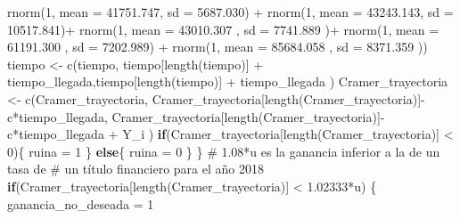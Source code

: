 \documentclass[
  us-letterpaper,
]{scrreprt}
\newenvironment{Shaded}{\begin{snugshade}}{\end{snugshade}}
\newcommand{\AttributeTok}[1]{\textcolor[rgb]{0.40,0.45,0.13}{#1}}
\newcommand{\CommentTok}[1]{\textcolor[rgb]{0.37,0.37,0.37}{#1}}
\newcommand{\ControlFlowTok}[1]{\textcolor[rgb]{0.00,0.23,0.31}{\textbf{#1}}}
\newcommand{\DecValTok}[1]{\textcolor[rgb]{0.68,0.00,0.00}{#1}}
\newcommand{\FloatTok}[1]{\textcolor[rgb]{0.68,0.00,0.00}{#1}}
\newcommand{\FunctionTok}[1]{\textcolor[rgb]{0.28,0.35,0.67}{#1}}
\newcommand{\NormalTok}[1]{\textcolor[rgb]{0.00,0.23,0.31}{#1}}
\newcommand{\OtherTok}[1]{\textcolor[rgb]{0.00,0.23,0.31}{#1}}
\newcommand{\SpecialCharTok}[1]{\textcolor[rgb]{0.37,0.37,0.37}{#1}}
\theoremstyle{definition}
\theoremstyle{plain}
\theoremstyle{plain}
\theoremstyle{remark}
\begin{document}
\begin{Shaded}
\begin{Highlighting}[]
               \FunctionTok{rnorm}\NormalTok{(}\DecValTok{1}\NormalTok{, }\AttributeTok{mean =}   \FloatTok{41751.747}\NormalTok{, }\AttributeTok{sd =} \FloatTok{5687.030}\NormalTok{) }\SpecialCharTok{+} 
               \FunctionTok{rnorm}\NormalTok{(}\DecValTok{1}\NormalTok{, }\AttributeTok{mean =}   \FloatTok{43243.143}\NormalTok{, }\AttributeTok{sd =} \FloatTok{10517.841}\NormalTok{)}\SpecialCharTok{+} 
               \FunctionTok{rnorm}\NormalTok{(}\DecValTok{1}\NormalTok{, }\AttributeTok{mean =} \FloatTok{43010.307}\NormalTok{  , }\AttributeTok{sd =} \FloatTok{7741.889}\NormalTok{ )}\SpecialCharTok{+}
               \FunctionTok{rnorm}\NormalTok{(}\DecValTok{1}\NormalTok{, }\AttributeTok{mean =} \FloatTok{61191.300}\NormalTok{  , }\AttributeTok{sd =} \FloatTok{7202.989}\NormalTok{) }\SpecialCharTok{+}
               \FunctionTok{rnorm}\NormalTok{(}\DecValTok{1}\NormalTok{, }\AttributeTok{mean =}  \FloatTok{85684.058}\NormalTok{ , }\AttributeTok{sd =} \FloatTok{8371.359}\NormalTok{ )) }
\NormalTok{    tiempo }\OtherTok{\textless{}{-}} \FunctionTok{c}\NormalTok{(tiempo, tiempo[}\FunctionTok{length}\NormalTok{(tiempo)] }\SpecialCharTok{+}
\NormalTok{                  tiempo\_llegada,tiempo[}\FunctionTok{length}\NormalTok{(tiempo)] }\SpecialCharTok{+} 
\NormalTok{                  tiempo\_llegada ) }
\NormalTok{    Cramer\_trayectoria }\OtherTok{\textless{}{-}} \FunctionTok{c}\NormalTok{(Cramer\_trayectoria,}
\NormalTok{                       Cramer\_trayectoria[}\FunctionTok{length}\NormalTok{(Cramer\_trayectoria)]}\SpecialCharTok{{-}}
\NormalTok{                          c}\SpecialCharTok{*}\NormalTok{tiempo\_llegada, }
\NormalTok{                       Cramer\_trayectoria[}\FunctionTok{length}\NormalTok{(Cramer\_trayectoria)]}\SpecialCharTok{{-}}
\NormalTok{                         c}\SpecialCharTok{*}\NormalTok{tiempo\_llegada }\SpecialCharTok{+}\NormalTok{  Y\_i )}
    \ControlFlowTok{if}\NormalTok{(Cramer\_trayectoria[}\FunctionTok{length}\NormalTok{(Cramer\_trayectoria)] }\SpecialCharTok{\textless{}} \DecValTok{0}\NormalTok{)\{}
\NormalTok{      ruina }\OtherTok{=} \DecValTok{1}
\NormalTok{    \}}
    \ControlFlowTok{else}\NormalTok{\{}
\NormalTok{      ruina }\OtherTok{=} \DecValTok{0}
\NormalTok{    \}}
\NormalTok{  \}}
\CommentTok{\# 1.08*u es la ganancia inferior a la de un tasa de }
\CommentTok{\# un título financiero para el año 2018}
  \ControlFlowTok{if}\NormalTok{(Cramer\_trayectoria[}\FunctionTok{length}\NormalTok{(Cramer\_trayectoria)] }\SpecialCharTok{\textless{}} \FloatTok{1.02333}\SpecialCharTok{*}\NormalTok{u) \{}
\NormalTok{    ganancia\_no\_deseada }\OtherTok{=} \DecValTok{1}
    

\end{Highlighting}
\end{Shaded}
\end{document}
